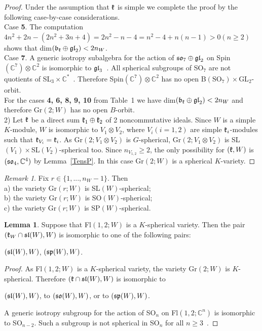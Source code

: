 \documentclass[12pt]{amsart}
\theoremstyle{definition}\newtheorem{theorem}{Theorem}[section]
\newtheorem{lemma}[proposition]{Lemma}
\theoremstyle{definition}\newtheorem{definition}[proposition]{Definition}
\theoremstyle{remark}\newtheorem{example}[proposition]{Example}
\newtheorem{remark}[proposition]{Remark}
\begin{document}
\begin{proof}
Under the assumption that $\frak k$ is simple we complete the proof by the following case-by-case considerations.\\
Case {\bf5}. The computation $4n^2+2n-(2n^2+3n+4)=2n^2-n-4=n^2-4+n(n-1)>0 (n\ge 2)$ shows that dim$(\frak b_\frak k\oplus\frak{gl}_2)< 2n_W$.\\Case {\bf7}. A generic isotropy subalgebra for the action of $\frak{so}_7\oplus\frak{gl}_2$ on Spin$(\mathbb C^7)\otimes\mathbb C^2$ is isomorphic to $\frak{gl}_3$~\cite{SK}. All spherical subgroups of SO$_7$ are not quotients of SL$_3\times\mathbb C^*$~\cite{Kr}. Therefore Spin$(\mathbb C^7)\otimes \mathbb C^2$ has no open B$(\mathrm{SO}_7)\times$GL$_2$-orbit.\\
For the cases {\bf4, 6, 8, 9, 10} from Table~1 we have dim$(\frak b_\frak k\oplus\frak{gl}_2)<2n_W$ and therefore Gr$(2; W)$ has no open $B$-orbit.\\
2) Let $\frak k$ be a direct sum $\frak k_1\oplus\frak k_2$ of 2 noncommutative ideals. Since $W$ is a simple $K$-module, $W$ is isomorphic to $V_1\otimes V_2$, where $V_i (i=1,2)$ are simple $\frak k_i$-modules such that $\frak k_{V_i}=\frak k_i$. As Gr$(2; V_1\otimes V_2)$ is $G$-spherical, Gr$(2; V_1\otimes V_2)$ is SL$(V_1)\times$SL$(V_2)$-spherical too. Since $n_{V_{1,2}}\ge 2$, the only possibility for $(\frak k, W)$ is $(\frak{so}_4, \mathbb C^4)$ by Lemma~\ref{TensP}. In this case Gr$(2; W)$ is a spherical $K$-variety.\end{proof}
\begin{remark}\label{Rsphgr} Fix $r\in\{1,..., n_W-1\}$. Then\\a) the variety Gr$(r; W)$ is SL$(W)$-spherical;\\b) the
variety Gr$(r; W)$ is SO$(W)$-spherical;\\c) the variety Gr$(r; W)$ is SP$(W)$-spherical.\end{remark}
\begin{lemma}\label{SimG}Suppose that Fl$(1,2; W)$ is a $K$-spherical variety. Then the pair $(\frak k_W\cap\frak{sl}(W), W)$ is isomorphic to one of the following pairs:\begin{center}$(\frak{sl}(W), W)$, $(\frak{sp}(W), W)$.\end{center}\end{lemma}
\begin{proof}As Fl$(1,2; W)$ is a $K$-spherical variety, the variety Gr$(2; W)$ is $K$-spherical. Therefore $(\frak k\cap\frak{sl}(W), W)$ is isomorphic to \begin{center}$(\frak{sl}(W), W)$, to $(\frak{so}(W), W)$, or to $(\frak{sp}(W), W)$.\end{center} A generic isotropy subgroup for
the action of SO$_n$ on Fl$(1,2; \mathbb C^n)$ is isomorphic to SO$_{n-2}$. Such a subgroup is not spherical in SO$_n$ for all $n\ge 3$~\cite{Kr}.\end{proof}
\end{document}
